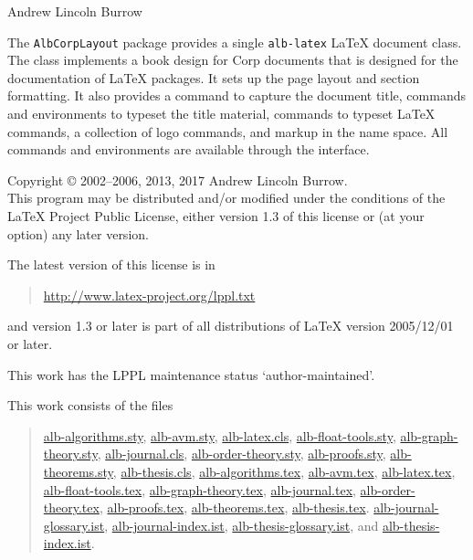 \documentclass[11pt,a4paper,oneside,titlepage]{alb-latex}
\begin{document}



\begin{albTitlePage}


  Andrew Lincoln Burrow


  The \texttt{AlbCorpLayout} package provides a single \texttt{alb-latex}
  \LaTeX{} document class.  The class implements a book design for
  \albLogo{}Corp documents that is designed for the documentation of
  \LaTeX{} packages.  It sets up the page layout and section formatting.
  It also provides a command to capture the document title, commands and
  environments to typeset the title material, commands to typeset
  \LaTeX{} commands, a collection of logo commands, and markup in the
  \albLogo{} name space.  All commands and environments are available
  through the \AUCTeX{} interface.



  Copyright \copyright{} 2002--2006, 2013, 2017 Andrew Lincoln Burrow.\\
  This program may be distributed and/or modified under the conditions
  of the \LaTeX{} Project Public License, either version 1.3 of this
  license or (at your option) any later version.

  \medskip{}

  The latest version of this license is in
  \begin{quote}
    \url{http://www.latex-project.org/lppl.txt}
  \end{quote}
  and version 1.3 or later is part of all distributions of LaTeX version
  2005/12/01 or later.

  \medskip{}

  This work has the LPPL maintenance status `author-maintained'.

  \medskip{}

  This work consists of the files
  \begin{quote}
    \begin{flushleft}
      \url{alb-algorithms.sty}, \url{alb-avm.sty}, \url{alb-latex.cls},
      \url{alb-float-tools.sty}, \url{alb-graph-theory.sty},
      \url{alb-journal.cls}, \url{alb-order-theory.sty},
      \url{alb-proofs.sty}, \url{alb-theorems.sty},
      \url{alb-thesis.cls}, \url{alb-algorithms.tex}, \url{alb-avm.tex},
      \url{alb-latex.tex}, \url{alb-float-tools.tex},
      \url{alb-graph-theory.tex}, \url{alb-journal.tex},
      \url{alb-order-theory.tex}, \url{alb-proofs.tex},
      \url{alb-theorems.tex}, \url{alb-thesis.tex}.
      \url{alb-journal-glossary.ist}, \url{alb-journal-index.ist},
      \url{alb-thesis-glossary.ist}, and \url{alb-thesis-index.ist}.
    \end{flushleft}
  \end{quote}



\end{albTitlePage}
\end{document}
